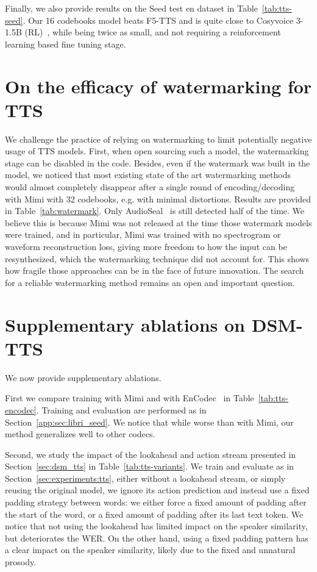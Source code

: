Finally, we also provide results on the Seed test en dataset in Table~\ref{tab:tts-seed}. Our 16 codebooks model beats F5-TTS and is quite close to Cosyvoice 3-1.5B (RL)~\citep{du2025cosyvoice}, while being twice as small, and not requiring a reinforcement learning based fine tuning stage.

\section{On the efficacy of watermarking for TTS}
\label{app:sec:watermark}

We challenge the practice of relying on watermarking to limit potentially negative usage of TTS models. First, when open sourcing such a model, the watermarking stage can be disabled in the code. Besides, even if the watermark was built in the model, we noticed that most existing state of the art watermarking methods would almost completely disappear after a single round of encoding/decoding with Mimi with 32 codebooks, e.g. with minimal distortions. Results are provided in Table~\ref{tab:watermark}. Only AudioSeal~\citep{sanroman2024proactive} is still detected half of the time. We believe this is because Mimi was not released at the time those watermark models were trained, and in particular, Mimi was trained with no spectrogram or waveform reconstruction loss, giving more freedom to how the input can be resynthesized, which the watermarking technique did not account for. This shows how fragile those approaches can be in the face of future innovation. The search for a reliable watermarking method remains an open and important question.

\section{Supplementary ablations on DSM-TTS}
\label{app:sec:ablations}
We now provide supplementary ablations.

First we compare training \oursTTS{} with Mimi and with EnCodec~\citep{encodec} in Table~\ref{tab:tts-encodec}. Training and evaluation are performed as in Section~\ref{app:sec:libri_seed}. We notice that while worse than with Mimi, our method generalizes well to other codecs. 

Second, we study the impact of the lookahead and action stream presented in Section~\ref{sec:dsm_tts} in Table~\ref{tab:tts-variants}. We train and evaluate as in Section~\ref{sec:experiments:tts}, either without a lookahead stream, or simply reusing the original \oursTTS{} model, we ignore its action prediction and instead use a fixed padding strategy between words: we either force a fixed amount of padding after the start of the word, or a fixed amount of padding after its last text token. We notice that not using the lookahead has limited impact on the speaker similarity, but deteriorates the WER. On the other hand, using a fixed padding pattern has a clear impact on the speaker similarity, likely due to the fixed and unnatural prosody.

